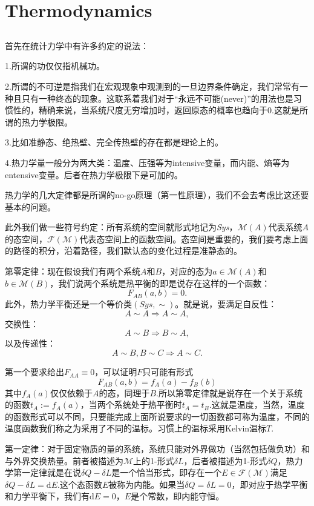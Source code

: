 \documentclass[10pt]{book}
\theoremstyle{plain}%
\begin{document}
\chapter{Thermodynamics}
\section{}
首先在统计力学中有许多约定的说法：

{\kaishu1.所谓的功仅仅指机械功。

2.所谓的不可逆是指我们在宏观现象中观测到的一旦边界条件确定，我们常常有一种且只有一种终态的现象。这联系着我们对于“永远不可能(never)”的用法也是习惯性的，精确来说，当系统尺度无穷增加时，返回原态的概率也趋向于0.这就是所谓的热力学极限。

3.比如准静态、绝热壁、完全传热壁的存在都是理论上的。

4.热力学量一般分为两大类：温度、压强等为intensive变量，而内能、熵等为entensive变量。后者在热力学极限下是可加的。}

热力学的几大定律都是所谓的no-go原理（第一性原理），我们不会去考虑比这还要基本的问题。

此外我们做一些符号约定：所有系统的空间就形式地记为\textit{Sys}，$\mathcal{M}(A)$代表系统$A$的态空间，$\mathcal{F(M)}$代表态空间上的函数空间。态空间是重要的，我们要考虑上面的路径的积分，沿着路径，我们默认态的变化过程是准静态的。

{\kaishu 第零定律}：现在假设我们有两个系统$A$和$B$，对应的态为$a \in \mathcal{M}(A)$和$b \in \mathcal{M}(B)$，我们说两个系统是热平衡的即是说存在这样的一个函数：
\[
F_{AB}(a,b)=0.
\]
此外，热力学平衡还是一个等价类$(\textit{Sys},\sim)$。就是说，要满足自反性：
\[
A\sim A \Rightarrow A\sim A,
\]
交换性：
\[
A\sim B \Rightarrow B\sim A,
\]
以及传递性：
\[
A\sim B,B\sim C \Rightarrow A\sim C.
\]

第一个要求给出$F_{AA}\equiv 0$，可以证明$F$只可能有形式
\[
F_{AB}(a,b)=f_A(a)-f_B(b)
\]
其中$f_A(a)$仅仅依赖于$A$的态，同理于$B$.所以第零定律就是说存在一个关于系统的函数$t_A:=f_A(a)$，当两个系统处于热平衡时$t_A=t_B$.这就是温度，当然，温度的函数形式可以不同，只要能完成上面所说要求的一切函数都可称为温度，不同的温度函数我们称之为采用了不同的温标。习惯上的温标采用Kelvin温标$T$.

{\kaishu 第一定律}：对于固定物质的量的系统，系统只能对外界做功（当然包括做负功）和与外界交换热量。前者被描述为$\mathcal{M}$上的1-形式$\delta L$，后者被描述为1-形式$\delta Q$，热力学第一定律就是在说$\delta Q-\delta L$是一个恰当形式，即存在一个$E \in \mathcal{F(M)}$满足$\delta Q-\delta L=\mathrm{d}E$.这个态函数$E$被称为内能。如果当$\delta Q=\delta L=0$，即对应于热学平衡和力学平衡下，我们有$\mathrm{d}E=0$，$E$是个常数，即内能守恒。
\end{document}

